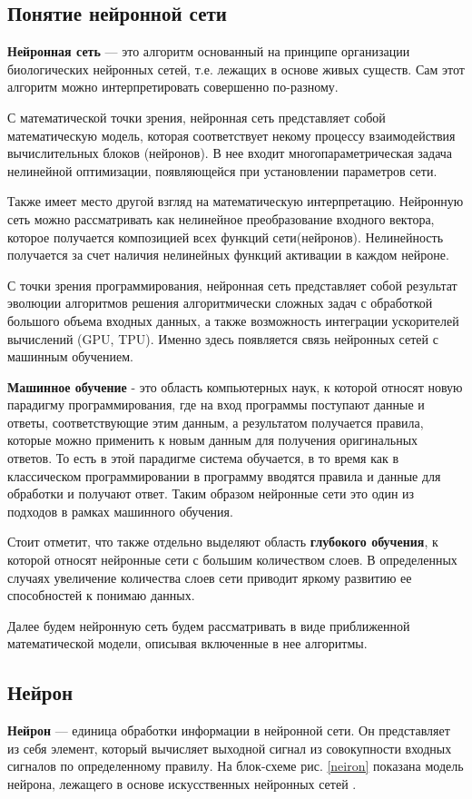 \documentclass[12pt, a4paper]{article}
\begin{document}
\subsection{Понятие нейронной сети}
\textbf{Нейронная сеть} --- это алгоритм основанный на принципе организации биологических нейронных сетей, т.е. лежащих в основе живых существ. Сам этот алгоритм можно интерпретировать совершенно по-разному.

С математической точки зрения, нейронная сеть представляет собой математическую модель, которая соответствует некому процессу взаимодействия вычислительных блоков (нейронов). В нее входит многопараметрическая задача нелинейной оптимизации, появляющейся при установлении параметров сети.\cite{3}

Также имеет место другой взгляд на математическую интерпретацию. Нейронную сеть можно рассматривать как нелинейное преобразование входного вектора, которое получается композицией всех функций сети(нейронов). Нелинейность получается за счет наличия нелинейных функций активации в каждом нейроне.

С точки зрения программирования, нейронная сеть представляет собой результат эволюции алгоритмов решения алгоритмически сложных задач с обработкой большого объема входных данных, а также возможность интеграции ускорителей вычислений (GPU, TPU). Именно здесь появляется связь нейронных сетей с машинным обучением. 

\textbf{Машинное обучение} - это область компьютерных наук, к которой относят новую парадигму программирования, где на вход программы поступают данные и ответы, соответствующие этим данным, а результатом получается правила, которые можно применить к новым данным для получения оригинальных ответов. То есть в этой парадигме система обучается, в то время как в классическом программировании в программу вводятся правила и данные для обработки и получают ответ. Таким образом нейронные сети это один из подходов в рамках машинного обучения. \cite[c.28]{9}

Стоит отметит, что также отдельно выделяют область \textbf{глубокого обучения}, к которой относят нейронные сети с большим количеством слоев. В определенных случаях увеличение количества слоев сети приводит яркому развитию ее способностей к понимаю данных. \cite[c.31]{9}

Далее будем нейронную сеть будем рассматривать в виде приближенной математической модели, описывая включенные в нее алгоритмы. 

\subsection{Нейрон}
\textbf{Нейрон} --- единица обработки информации в нейронной сети. Он представляет из себя элемент, который вычисляет выходной сигнал из совокупности входных сигналов по определенному правилу. На блок-схеме рис. \ref{neiron} показана модель нейрона, лежащего в основе искусственных нейронных сетей \cite[c.28]{7}. 
\end{document}
